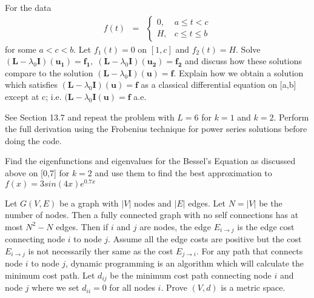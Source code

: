 \documentclass[11pt]{SelfArxOneColBMN}
\affiliation{\textsuperscript{1}\textit{John E. Walker Department of Economics,
Clemson University,Clemson, SC: email ijdavis@g.clemson.edu}}
\date{\small{Version ~\today}}
\begin{document}
\flushbottom

\maketitle

\renewcommand{\theexercise}{\arabic{exercise}}
\begin{exercise}
  For the data
  \begin{eqnarray*}
    f(t) &=&
    \left \{
    \begin{array}{ll}
     0, & a \leq t < c\\
     H, & c \leq t \leq b
    \end{array}
    \right .
  \end{eqnarray*}
\noindent
for some $a < c < b$. Let $f_1(t) = 0$ on $[1,c]$ and $f_2(t) = H$. Solve $(\mathbf{L} - \lambda_0\mathbf{I})(\mathbf{u_1}) = \mathbf{f_1}, \; (\mathbf{L} - \lambda_0\mathbf{I})(\mathbf{u_2}) = \mathbf{f_2}$ and discuss how these solutions compare to the solution $(\mathbf{L} - \lambda_0\mathbf{I})(\mathbf{u}) = \mathbf{f}$. Explain how we obtain a solution which satisfies $(\mathbf{L} - \lambda_0\mathbf{I})(\mathbf{u}) = \mathbf{f}$ as a classical differential equation on [a,b] except at c; i.e. $(\mathbf{L} - \lambda_0\mathbf{I}(\mathbf{u}) = \mathbf{f}$ a.e.
\end{exercise}

\begin{exercise}
  See Section 13.7 and repeat the problem with $L =6$ for $k = 1$ and $k = 2$. Perform the full derivation using the Frobenius technique for power series solutions before doing the code. 
\end{exercise}

\begin{exercise}
  Find the eigenfunctions and eigenvalues for the Bessel's Equation as discussed above on [0,7] for $k =2$ and use them to find the best approximation to $f(x) = 3sin(4x)e^{0.7x}$
\end{exercise}

\begin{exercise}
  Let $G(V,E)$ be a graph with $|V|$ nodes and $|E|$ edges. Let $N = |V|$ be the number of nodes. Then a fully connected graph with no self connections has at most $N^2 - N$ edges. Then if $i$ and $j$ are nodes, the edge $E_{i \rightarrow j}$ is the edge cost connecting node $i$ to node $j$. Assume all the edge costs are positive but the cost $E_{i \rightarrow j}$ is not necessarily ther same as the cost $E_{j \rightarrow i}$. For any path that connects node $i$ to node $j$, dynamic programming is an algorithm which will calculate the minimum cost path. Let $d_{ij}$ be the minimum cost path connecting node $i$ and node $j$ where we set $d_{ii} = 0$ for all nodes $i$. Prove $(V,d)$ is a metric space.
\end{exercise}
\end{document}
